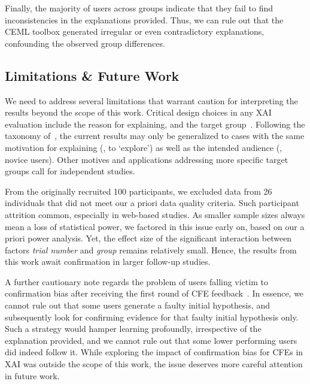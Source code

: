 {%
Finally, the majority of users across groups indicate that they fail to find inconsistencies in the explanations provided.
Thus, we can rule out that the CEML toolbox generated irregular or even contradictory explanations, confounding the observed group differences.

\subsection{Limitations \& Future Work}\label{subsec:limitations-future-work}

We need to address several limitations that warrant caution for interpreting the results beyond the scope of this work.
Critical design choices in any \gls{XAI} evaluation include the reason for explaining, and the target group~\cite{adadi_peeking_2018}.
Following the taxonomy of~\citeauthor{adadi_peeking_2018}, the current results may only be generalized to cases with the same motivation for explaining (\ie, to `explore') as well as the intended audience (\ie, novice users).
Other motives and applications addressing more specific target groups call for independent studies.

From the originally recruited 100 participants, we excluded data from 26 individuals that did not meet our a priori data quality criteria.
Such participant attrition common, especially in web-based studies. 
As smaller sample sizes always mean a loss of statistical power, we factored in this issue early on, based on our a priori power analysis. 
Yet, the effect size of the significant interaction between factors \textit{trial number} and \textit{group} remains relatively small. 
Hence, the results from this work await confirmation in larger follow-up studies.

A further cautionary note regards the problem of users falling victim to confirmation bias after receiving the first round of \gls{CFE} feedback~\citep{wang_designing_2019}. 
In essence, we cannot rule out that some users generate a faulty initial hypothesis, and subsequently look for confirming evidence for that faulty initial hypothesis only. 
Such a strategy would hamper learning profoundly, irrespective of the explanation provided, and we cannot rule out that some lower performing users did indeed follow it.
While exploring the impact of confirmation bias for \glspl{CFE} in \gls{XAI} was outside the scope of this work, the issue deserves more careful attention in future work.

}
